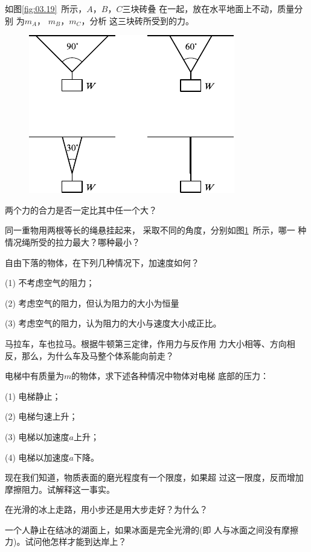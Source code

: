 \begin{questions}
  \question 如图\ref{fig:03.19}~所示，$ A $，$ B $，$ C $三块砖叠
  在一起，放在水平地面上不动，质量分别
  为$ m_A $， $ m _ B $，$ m_C $，分析
  这三块砖所受到的力。

  \begin{figure}
    \centering
    \includegraphics{figure/fig03.20}
    \caption{}
    \label{fig:03.20}
  \end{figure}
  \question 两个力的合力是否一定比其中任一个大？

  \question 同一重物用两根等长的绳悬挂起来，
  采取不同的角度，分别如图\ref{fig:03.20}~所示，哪一
  种情况绳所受的拉力最大？哪种最小？

  \clearpage
  \question 自由下落的物体，在下列几种情况下，加速度如何？

  (1) 不考虑空气的阻力；

  (2) 考虑空气的阻力，但认为阻力的大小为恒量

  (3) 考虑空气的阻力，认为阻力的大小与速度大小成正比。

  \question 马拉车，车也拉马。根据牛顿第三定律，作用力与反作用
  力大小相等、方向相反，那么，为什么车及马整个体系能向前走？

  \question 电梯中有质量为$ m $的物体，求下述各种情况中物体对电梯
  底部的压力：

  (1) 电梯静止；

  (2) 电梯匀速上升；

  (3) 电梯以加速度$ a $上升；

  (4) 电梯以加速度$ a $下降。

  \question 现在我们知道，物质表面的磨光程度有一个限度，如果超
  过这一限度，反而增加摩擦阻力。试解释这一事实。

  \question 在光滑的冰上走路，用小步还是用大步走好？为什么？

  \question 一个人静止在结冰的湖面上，如果冰面是完全光滑的(即
  人与冰面之间没有摩擦力)。试问他怎样才能到达岸上？


\end{questions}
